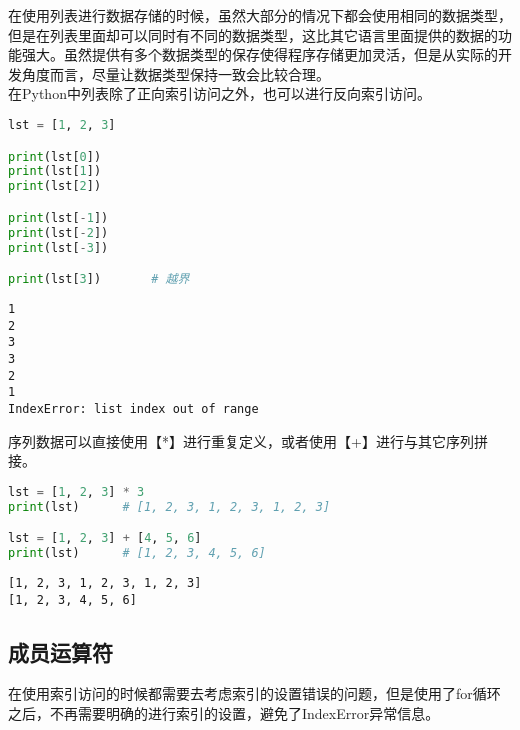 在使用列表进行数据存储的时候，虽然大部分的情况下都会使用相同的数据类型，但是在列表里面却可以同时有不同的数据类型，这比其它语言里面提供的数据的功能强大。虽然提供有多个数据类型的保存使得程序存储更加灵活，但是从实际的开发角度而言，尽量让数据类型保持一致会比较合理。\\

在Python中列表除了正向索引访问之外，也可以进行反向索引访问。\\


\begin{lstlisting}[language=Python]
lst = [1, 2, 3]

print(lst[0])
print(lst[1])
print(lst[2])

print(lst[-1])
print(lst[-2])
print(lst[-3])

print(lst[3])       # 越界
\end{lstlisting}

\begin{tcolorbox}
	\begin{verbatim}
1
2
3
3
2
1
IndexError: list index out of range
\end{verbatim}
\end{tcolorbox}

序列数据可以直接使用【*】进行重复定义，或者使用【+】进行与其它序列拼接。\\


\begin{lstlisting}[language=Python]
lst = [1, 2, 3] * 3
print(lst)      # [1, 2, 3, 1, 2, 3, 1, 2, 3]

lst = [1, 2, 3] + [4, 5, 6]
print(lst)      # [1, 2, 3, 4, 5, 6]
\end{lstlisting}

\begin{tcolorbox}
	\begin{verbatim}
[1, 2, 3, 1, 2, 3, 1, 2, 3]
[1, 2, 3, 4, 5, 6]
\end{verbatim}
\end{tcolorbox}

\vspace{0.5cm}

\subsection{成员运算符}

在使用索引访问的时候都需要去考虑索引的设置错误的问题，但是使用了for循环之后，不再需要明确的进行索引的设置，避免了IndexError异常信息。\\

